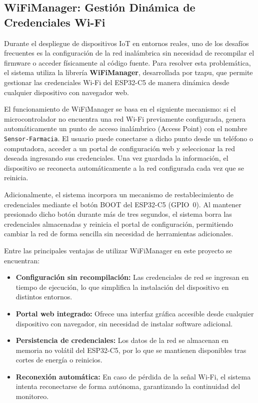 \subsection{WiFiManager: Gestión Dinámica de Credenciales Wi-Fi}

Durante el despliegue de dispositivos IoT en entornos reales, uno de los desafíos frecuentes es la configuración de la red inalámbrica sin necesidad de recompilar el firmware o acceder físicamente al código fuente. Para resolver esta problemática, el sistema utiliza la librería \textbf{WiFiManager}, desarrollada por tzapu, que permite gestionar las credenciales Wi-Fi del ESP32-C5 de manera dinámica desde cualquier dispositivo con navegador web.

El funcionamiento de WiFiManager se basa en el siguiente mecanismo: si el microcontrolador no encuentra una red Wi-Fi previamente configurada, genera automáticamente un punto de acceso inalámbrico (Access Point) con el nombre \texttt{Sensor-Farmacia}. El usuario puede conectarse a dicho punto desde un teléfono o computadora, acceder a un portal de configuración web y seleccionar la red deseada ingresando sus credenciales. Una vez guardada la información, el dispositivo se reconecta automáticamente a la red configurada cada vez que se reinicia.

Adicionalmente, el sistema incorpora un mecanismo de restablecimiento de credenciales mediante el botón BOOT del ESP32-C5 (GPIO~0). Al mantener presionado dicho botón durante más de tres segundos, el sistema borra las credenciales almacenadas y reinicia el portal de configuración, permitiendo cambiar la red de forma sencilla sin necesidad de herramientas adicionales.

Entre las principales ventajas de utilizar WiFiManager en este proyecto se encuentran:

\begin{itemize}
    \item \textbf{Configuración sin recompilación:} Las credenciales de red se ingresan en tiempo de ejecución, lo que simplifica la instalación del dispositivo en distintos entornos.
    \item \textbf{Portal web integrado:} Ofrece una interfaz gráfica accesible desde cualquier dispositivo con navegador, sin necesidad de instalar software adicional.
    \item \textbf{Persistencia de credenciales:} Los datos de la red se almacenan en memoria no volátil del ESP32-C5, por lo que se mantienen disponibles tras cortes de energía o reinicios.
    \item \textbf{Reconexión automática:} En caso de pérdida de la señal Wi-Fi, el sistema intenta reconectarse de forma autónoma, garantizando la continuidad del monitoreo.
\end{itemize}

